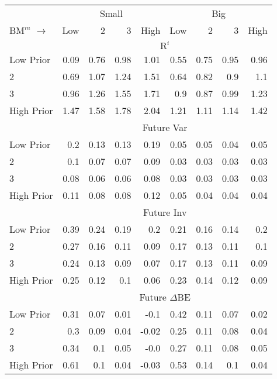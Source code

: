 
\begin{tabular}{lrrrrrrrr}
  \toprule
     & \multicolumn{4}{c}{Small} & \multicolumn{4}{c}{Big}  \\
     \cmidrule(r){2-5} \cmidrule(r){6-9}
    $\text{BM}^m$ $\rightarrow$ & Low & 2 & 3 & High & Low & 2 & 3 & High  \\ 
  \midrule
  
  
    & \multicolumn{8}{c}{$\text{R}^i$}  \\
     \cmidrule(r){2-5} \cmidrule(r){6-9}
    Low Prior  & 0.09  & 0.76  & 0.98  & 1.01  & 0.55  & 0.75  & 0.95  & 0.96   \\
    2  & 0.69  & 1.07  & 1.24  & 1.51  & 0.64  & 0.82  & 0.9  & 1.1   \\
    3  & 0.96  & 1.26  & 1.55  & 1.71  & 0.9  & 0.87  & 0.99  & 1.23   \\
    High Prior  & 1.47  & 1.58  & 1.78  & 2.04  & 1.21  & 1.11  & 1.14  & 1.42   \\
    
  
    & \multicolumn{8}{c}{Future Var}  \\
     \cmidrule(r){2-5} \cmidrule(r){6-9}
    Low Prior  & 0.2  & 0.13  & 0.13  & 0.19  & 0.05  & 0.05  & 0.04  & 0.05   \\
    2  & 0.1  & 0.07  & 0.07  & 0.09  & 0.03  & 0.03  & 0.03  & 0.03   \\
    3  & 0.08  & 0.06  & 0.06  & 0.08  & 0.03  & 0.03  & 0.03  & 0.03   \\
    High Prior  & 0.11  & 0.08  & 0.08  & 0.12  & 0.05  & 0.04  & 0.04  & 0.04   \\
    
  
    & \multicolumn{8}{c}{Future Inv}  \\
     \cmidrule(r){2-5} \cmidrule(r){6-9}
    Low Prior  & 0.39  & 0.24  & 0.19  & 0.2  & 0.21  & 0.16  & 0.14  & 0.2   \\
    2  & 0.27  & 0.16  & 0.11  & 0.09  & 0.17  & 0.13  & 0.11  & 0.1   \\
    3  & 0.24  & 0.13  & 0.09  & 0.07  & 0.17  & 0.13  & 0.11  & 0.09   \\
    High Prior  & 0.25  & 0.12  & 0.1  & 0.06  & 0.23  & 0.14  & 0.12  & 0.09   \\
    
  
    & \multicolumn{8}{c}{Future $\Delta\text{BE}$}  \\
     \cmidrule(r){2-5} \cmidrule(r){6-9}
    Low Prior  & 0.31  & 0.07  & 0.01  & -0.1  & 0.42  & 0.11  & 0.07  & 0.02   \\
    2  & 0.3  & 0.09  & 0.04  & -0.02  & 0.25  & 0.11  & 0.08  & 0.04   \\
    3  & 0.34  & 0.1  & 0.05  & -0.0  & 0.27  & 0.11  & 0.08  & 0.05   \\
    High Prior  & 0.61  & 0.1  & 0.04  & -0.03  & 0.53  & 0.14  & 0.1  & 0.04   \\
    
  
  \bottomrule
\end{tabular}
